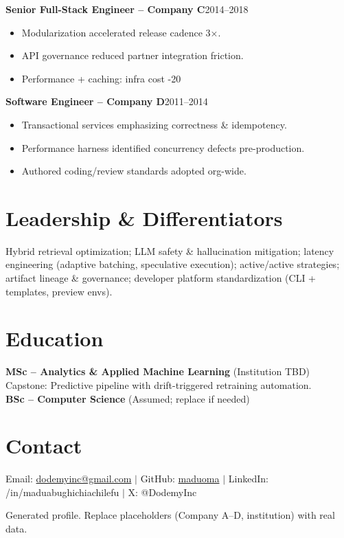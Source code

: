\documentclass[11pt,a4paper]{article}
\begin{document}
\textbf{Senior Full-Stack Engineer -- Company C}\hfill 2014--2018\\
\begin{itemize}
  \item Modularization accelerated release cadence 3×.
  \item API governance reduced partner integration friction.
  \item Performance + caching: infra cost -20%
\end{itemize}

\textbf{Software Engineer -- Company D}\hfill 2011--2014\\
\begin{itemize}
  \item Transactional services emphasizing correctness \& idempotency.
  \item Performance harness identified concurrency defects pre-production.
  \item Authored coding/review standards adopted org-wide.
\end{itemize}

\section*{Leadership \& Differentiators}
Hybrid retrieval optimization; LLM safety \& hallucination mitigation; latency engineering (adaptive batching, speculative execution); active/active strategies; artifact lineage \& governance; developer platform standardization (CLI + templates, preview envs).

\section*{Education}
\textbf{MSc -- Analytics & Applied Machine Learning} (Institution TBD)\\
Capstone: Predictive pipeline with drift-triggered retraining automation.\\[2pt]
\textbf{BSc -- Computer Science} (Assumed; replace if needed)

\section*{Contact}
Email: \href{mailto:dodemyinc@gmail.com}{dodemyinc@gmail.com} $|$ GitHub: \href{https://github.com/maduoma}{maduoma} $|$ LinkedIn: /in/maduabughichiachilefu $|$ X: @DodemyInc

\vfill
\centerline{\scriptsize Generated profile. Replace placeholders (Company A–D, institution) with real data.}
\end{document}
